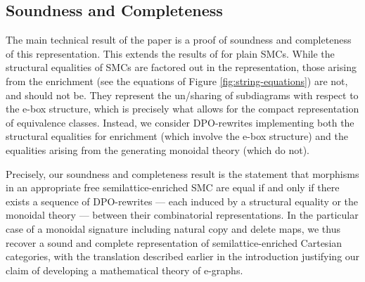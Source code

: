 \subsection{Soundness and Completeness}
The main technical result of the paper is a proof of soundness and completeness of this representation.  This extends the results of \cite{bonchi_string_2022-2} for plain SMCs. While the structural equalities of SMCs are factored out in the representation,  those arising from the enrichment (see the equations of Figure \ref{fig:string-equations}) are not, and should not be. They represent the un/sharing of subdiagrams with respect to the e-box structure,  which is precisely what allows for the compact representation of equivalence classes.  Instead, we consider DPO-rewrites implementing both the structural equalities for enrichment (which involve the e-box structure) and the equalities arising from the generating monoidal theory (which do not).  

Precisely,  our soundness and completeness result is the statement that morphisms in an appropriate free semilattice-enriched SMC are equal  if and only if there exists a sequence of DPO-rewrites --- each induced by a structural equality or the monoidal theory --- between their combinatorial representations. 
In the particular case of a monoidal signature including natural copy and delete maps,  we thus recover a sound and complete representation of semilattice-enriched Cartesian categories,  with the translation described earlier in the introduction justifying our claim of developing a mathematical theory of e-graphs. 

%

